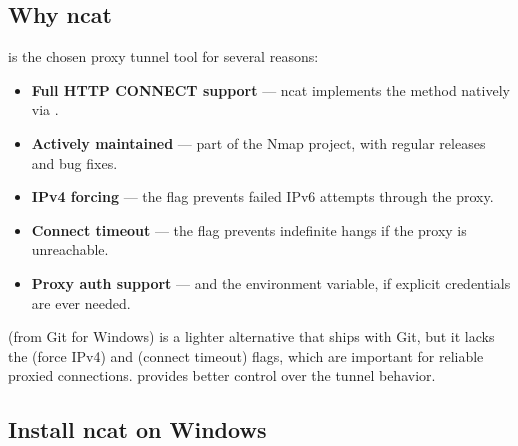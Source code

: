\documentclass{guide}
\begin{document}
\subsection{Why ncat}

 is the chosen proxy tunnel tool for several reasons:

\begin{itemize}
  \item \textbf{Full HTTP CONNECT support} --- ncat implements the
         method natively via .
  \item \textbf{Actively maintained} --- part of the Nmap project, with regular
        releases and bug fixes.
  \item \textbf{IPv4 forcing} --- the  flag prevents failed IPv6
        attempts through the proxy.
  \item \textbf{Connect timeout} --- the  flag prevents indefinite
        hangs if the proxy is unreachable.
  \item \textbf{Proxy auth support} ---  and the
         environment variable, if explicit
        credentials are ever needed.
\end{itemize}

\begin{infobox}
 (from Git for Windows) is a lighter alternative that
ships with Git, but it lacks the  (force IPv4) and 
(connect timeout) flags, which are important for reliable proxied connections.
 provides better control over the tunnel behavior.
\end{infobox}

\subsection{Install ncat on Windows}

\end{document}
